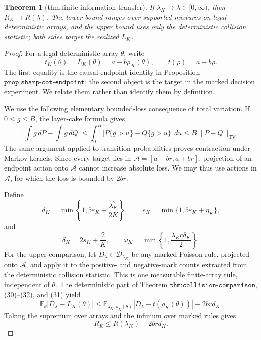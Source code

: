 \documentclass{article}
\newtheorem{theorem}{Theorem}
\begin{document}
\begin{theorem}[thm:finite-information-transfer]\label{thm:finite-information-transfer}
If \(\lambda_K\to\lambda\in[0,\infty)\), then \(R_K\to R(\lambda)\). The lower bound ranges over supported mixtures on legal deterministic arrays, and the upper bound uses only the deterministic collision statistic; both sides target the realized \(L_K\).
\end{theorem}
\begin{proof}
For a legal deterministic array \(\theta\), write
\[
 t_K(\theta)=L_K(\theta)=a-b\rho_K(\theta),
 \qquad
 t(\rho)=a-b\rho.
 \tag{30}
\]
The first equality is the causal endpoint identity in Proposition
\(\texttt{prop:sharp-cot-endpoint}\); the second object is the target in
the marked decision experiment.  We relate them rather than identify
them by definition.

We use the following elementary bounded-loss consequence of total
variation.  If \(0\le g\le B\), the layer-cake formula gives
\[
 \left|\int g\,dP-\int g\,dQ\right|
 \le\int_0^B|P\{g>u\}-Q\{g>u\}|\,du
 \le B\|P-Q\|_{\mathrm{TV}}.
 \tag{31}
\]
The same argument applied to transition probabilities proves contraction
under Markov kernels.  Since every target lies in
\(\mathcal A=[a-br,a+br]\), projection of an endpoint action onto
\(\mathcal A\) cannot increase absolute loss.  We may thus use actions
in \(\mathcal A\), for which the loss is bounded by \(2br\).

Define
\[
 d_K=\min\left\{1,5\varepsilon_K+\frac{\lambda_K^2}{2K}\right\},
 \qquad
 e_K=\min\{1,5\varepsilon_K+\eta_K\},
 \tag{32}
\]
and
\[
 \delta_K=2s_K+\frac2K,
 \qquad
 \omega_K=\min\left\{1,\frac{\lambda_Kc\delta_K}{2}\right\}.
 \tag{33}
\]
For the upper comparison, let
\(D_\lambda\in\mathscr D_{\lambda_K}\) be any marked-Poisson rule,
projected onto \(\mathcal A\), and apply it to the positive- and
negative-mark counts extracted from the deterministic collision
statistic.  This is one measurable finite-array rule, independent of
\(\theta\).  The deterministic part of Theorem
\(\texttt{thm:collision-comparison}\), (30)--(32), and (31) yield
\[
 \mathbb E_\theta|D_\lambda-L_K(\theta)|
 \le
 \mathbb E_{\lambda_K,\rho_K(\theta)}
 |D_\lambda-t(\rho_K(\theta))|+2brd_K.
 \tag{34}
\]
Taking the supremum over arrays and the infimum over marked rules gives
\[
 R_K\le R(\lambda_K)+2brd_K.
 \tag{35}
\]


\end{proof}
\end{document}
